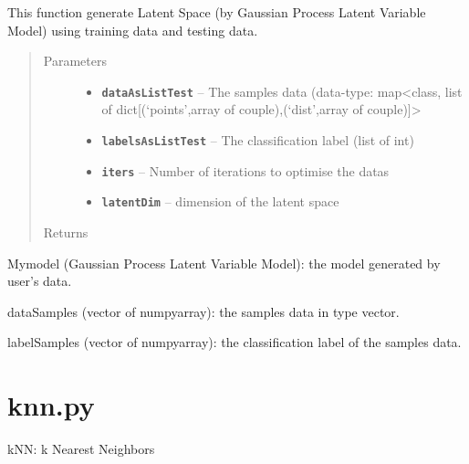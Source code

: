 \documentclass[letterpaper,10pt,english]{sphinxmanual}
\begin{document}
\begin{fulllineitems}
\label{Documentation of Code:getLatentSpace.genLatentSpaceTest}
This function generate Latent Space (by Gaussian Process Latent Variable Model) using training data and testing data.
\begin{quote}\begin{description}
\item[{Parameters}] \leavevmode\begin{itemize}
\item {} 
\textbf{\texttt{dataAsListTest}} -- The samples data (data-type: map\textless{}class, list of dict{[}(`points',array of couple),(`dist',array of couple){]}\textgreater{}

\item {} 
\textbf{\texttt{labelsAsListTest}} -- The classification label (list of int)

\item {} 
\textbf{\texttt{iters}} -- Number of iterations to optimise the datas

\item {} 
\textbf{\texttt{latentDim}} -- dimension of the latent space

\end{itemize}

\item[{Returns}] \leavevmode


\end{description}\end{quote}

Mymodel (Gaussian Process Latent Variable Model):  the model generated by user's data.

dataSamples (vector of numpyarray): the samples data in type vector.

labelSamples (vector of numpyarray): the classification label of the samples data.

\end{fulllineitems}



\section{knn.py}
\label{Documentation of Code:module-classify.knn}\label{Documentation of Code:knn-py}
kNN: k Nearest Neighbors
\end{document}
